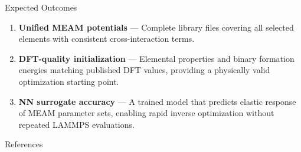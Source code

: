 \begin{frame}{Expected Outcomes}
\begin{enumerate}
  \item \textbf{Unified MEAM potentials} --- Complete library files covering all selected elements with consistent cross-interaction terms.

  \vspace{0.5em}
  \item \textbf{DFT-quality initialization} --- Elemental properties and binary formation energies matching published DFT values, providing a physically valid optimization starting point.

  \vspace{0.5em}
  \item \textbf{NN surrogate accuracy} --- A trained model that predicts elastic response of MEAM parameter sets, enabling rapid inverse optimization without repeated LAMMPS evaluations.
\end{enumerate}
\end{frame}

\begin{frame}[allowframebreaks]{References}
\small


\end{frame}
